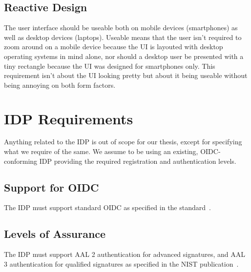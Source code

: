 \subsection{Reactive Design}\label{subsec:reactive-design}
The user interface should be useable both on mobile devices (smartphones) as well as desktop devices (laptops).
Useable means that the user isn't required to zoom around on a mobile device because the \gls{UI} is layouted with desktop operating systems in mind alone,
nor should a desktop user be presented with a tiny rectangle because the \gls{UI} was designed for smartphones only.
This requirement isn't about the \gls{UI} looking pretty but about it being useable without being annoying on both form factors.

\section{IDP Requirements}\label{sec:idp-requirements}
Anything related to the \gls{IDP} is out of scope for our thesis, except for specifying what we require of the same.
We assume to be using an existing, \gls{OIDC}-conforming \gls{IDP} providing the required registration and authentication levels.

\subsection{Support for OIDC}\label{subsec:support-for-oidc}
The \gls{IDP} must support standard \gls{OIDC} as specified in the standard~\cite{oidc}.


\subsection{Levels of Assurance}\label{subsec:levels-of-assurance}
The \gls{IDP} must support \gls{AAL} 2 authentication for advanced signatures, and \gls{AAL} 3 authentication for qualified signatures as specified in the \gls{NIST} publication~\cite{nistdigitalidentityguidelines}.


